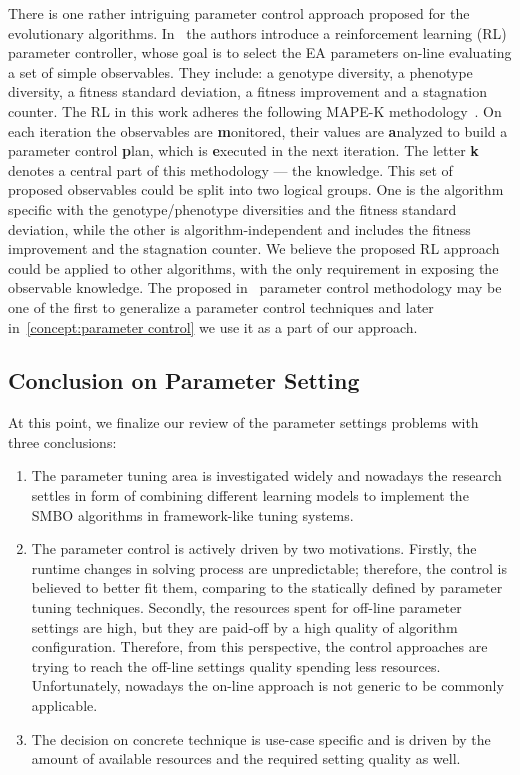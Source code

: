There is one rather intriguing parameter control approach proposed for the evolutionary algorithms. In~\cite{karafotias2014generic} the authors introduce a reinforcement learning (RL) parameter controller, whose goal is to select the EA parameters on-line evaluating a set of simple observables. They include: a genotype diversity, a phenotype diversity, a fitness standard deviation, a fitness improvement and a stagnation counter.
The RL in this work adheres the following MAPE-K methodology~\cite{brun2009engineering}. On each iteration the observables are \textbf{m}onitored, their values are \textbf{a}nalyzed to build a parameter control \textbf{p}lan, which is \textbf{e}xecuted in the next iteration. The letter \textbf{k} denotes a central part of this methodology — the knowledge.
This set of proposed observables could be split into two logical groups. One is the algorithm specific with the genotype/phenotype diversities and the fitness standard deviation, while the other is algorithm-independent and includes the fitness improvement and the stagnation counter. We believe the proposed RL approach could be applied to other algorithms, with the only requirement in exposing the observable knowledge. The proposed in~\cite{karafotias2014generic} parameter control methodology may be one of the first to generalize a parameter control techniques and later in~\cref{concept:parameter control} we use it as a part of our approach.


\subsection{Conclusion on Parameter Setting}\label{bg: parameter setting conclution}
At this point, we finalize our review of the parameter settings problems with three conclusions:
\begin{enumerate}
	\item The parameter tuning area is investigated widely and nowadays the research settles in form of combining different learning models to implement the SMBO algorithms in framework-like tuning systems.
	
	\item The parameter control is actively driven by two motivations. Firstly, the runtime changes in solving process are unpredictable; therefore, the control is believed to better fit them, comparing to the statically defined by parameter tuning techniques. Secondly, the resources spent for off-line parameter settings are high, but they are paid-off by a high quality of algorithm configuration. Therefore, from this perspective, the control approaches are trying to reach the off-line settings quality spending less resources. Unfortunately, nowadays the on-line approach is not generic to be commonly applicable.
	
	\item The decision on concrete technique is use-case specific and is driven by the amount of available resources and the required setting quality as well.
\end{enumerate}

